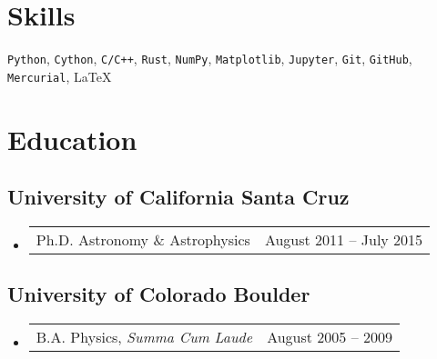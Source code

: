 \documentclass[10pt,letterpaper]{article}
\newcommand{\textline}[2]{
  \begin{tabularx}{\textwidth}{XY}
  #1 & #2
  \end{tabularx}
}
\begin{document}
\section*{Skills}

\texttt{Python}, \texttt{Cython}, \texttt{C/C++}, \texttt{Rust}, \texttt{NumPy}, \texttt{Matplotlib},
\texttt{Jupyter}, \texttt{Git}, \texttt{GitHub}, \texttt{Mercurial}, \LaTeX\

\section*{Education}

\subsection*{University of California Santa Cruz}
\begin{itemize}
\item[] \textline{Ph.D. Astronomy \& Astrophysics}{August 2011 -- July 2015}  %
\end{itemize}

\subsection*{University of Colorado Boulder}
\begin{itemize}
  \item[] \textline{B.A. Physics, \textit{Summa Cum Laude}}{August 2005 -- 2009}  %
\end{itemize}
\end{document}

